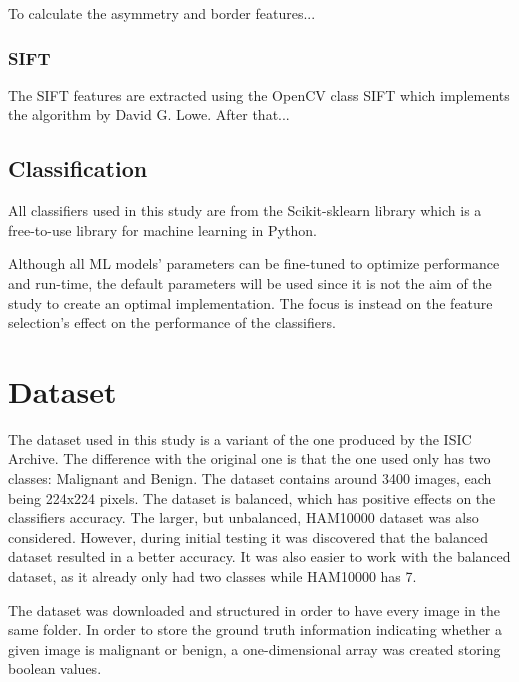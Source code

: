 \documentclass{kththesis}
\begin{document}
To calculate the asymmetry and border features...



\subsubsection{SIFT}

The SIFT features are extracted using the OpenCV class SIFT which implements the algorithm by David G. Lowe. %
After that...


\subsection{Classification}

All classifiers used in this study are from the Scikit-sklearn library which is a free-to-use library for machine learning in Python.%

Although all ML models’ parameters can be fine-tuned to optimize performance and run-time, the default parameters will be used since it is not the aim of the study to create an optimal implementation. The focus is instead on the feature selection’s effect on the performance of the classifiers.


\section{Dataset}

The dataset used in this study is a variant of the one produced by the ISIC Archive. The difference with the original one is that the one used only has two classes: Malignant and Benign. The dataset contains around 3400 images, each being 224x224 pixels. The dataset is balanced, which has positive effects on the classifiers accuracy. The larger, but unbalanced, HAM10000 dataset was also considered. However, during initial testing it was discovered that the balanced dataset resulted in a better accuracy. It was also easier to work with the balanced dataset, as it already only had two classes while HAM10000 has 7.

The dataset was downloaded and structured in order to have every image in the same folder. In order to store the ground truth information indicating whether a given image is malignant or benign, a one-dimensional array was created storing boolean values.
\end{document}
